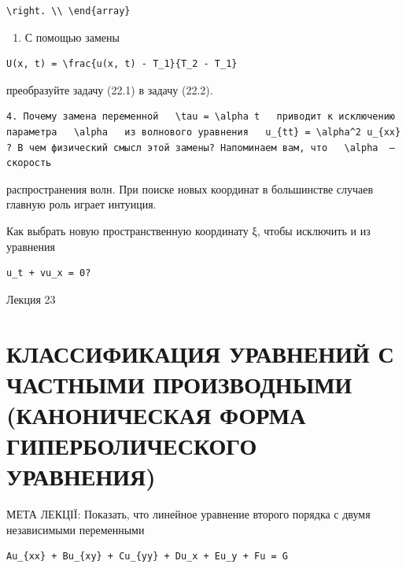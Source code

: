 \documentclass[
  ukrainian,
]{article}
\providecommand{\tightlist}{%
  \setlength{\itemsep}{0pt}\setlength{\parskip}{0pt}}
\begin{document}
\begin{verbatim}
\right. \\ \end{array}
\end{verbatim}

\begin{enumerate}
\def\labelenumi{\arabic{enumi}.}
\setcounter{enumi}{2}
\tightlist
\item
  С помощью замены
\end{enumerate}

\begin{verbatim}
U(x, t) = \frac{u(x, t) - T_1}{T_2 - T_1}
\end{verbatim}

преобразуйте задачу (22.1) в задачу (22.2).

\begin{verbatim}
4. Почему замена переменной   \tau = \alpha t   приводит к исключению параметра   \alpha   из волнового уравнения   u_{tt} = \alpha^2 u_{xx}  ? В чем физический смысл этой замены? Напоминаем вам, что   \alpha  —скорость
\end{verbatim}

распространения волн. При поиске новых координат в большинстве случаев
главную роль играет интуиция.

Как выбрать новую пространственную координату ξ, чтобы исключить и из
уравнения

\begin{verbatim}
u_t + vu_x = 0?
\end{verbatim}

Лекция 23

\section{КЛАССИФИКАЦИЯ УРАВНЕНИЙ С ЧАСТНЫМИ ПРОИЗВОДНЫМИ (КАНОНИЧЕСКАЯ
ФОРМА ГИПЕРБОЛИЧЕСКОГО
УРАВНЕНИЯ)}\label{ux43aux43bux430ux441ux441ux438ux444ux438ux43aux430ux446ux438ux44f-ux443ux440ux430ux432ux43dux435ux43dux438ux439-ux441-ux447ux430ux441ux442ux43dux44bux43cux438-ux43fux440ux43eux438ux437ux432ux43eux434ux43dux44bux43cux438-ux43aux430ux43dux43eux43dux438ux447ux435ux441ux43aux430ux44f-ux444ux43eux440ux43cux430-ux433ux438ux43fux435ux440ux431ux43eux43bux438ux447ux435ux441ux43aux43eux433ux43e-ux443ux440ux430ux432ux43dux435ux43dux438ux44f}

МЕТА ЛЕКЦІЇ: Показать, что линейное уравнение второго порядка с двумя
независимыми переменными

\begin{verbatim}
Au_{xx} + Bu_{xy} + Cu_{yy} + Du_x + Eu_y + Fu = G
\end{verbatim}
\end{document}
